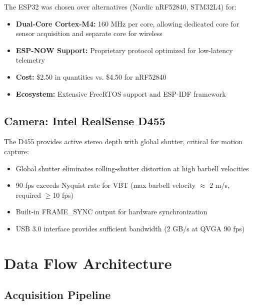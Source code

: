The ESP32 was chosen over alternatives (Nordic nRF52840, STM32L4) for:

\begin{itemize}
    \item \textbf{Dual-Core Cortex-M4:} 160 MHz per core, allowing dedicated core for sensor acquisition and separate core for wireless
    \item \textbf{ESP-NOW Support:} Proprietary protocol optimized for low-latency telemetry
    \item \textbf{Cost:} \$2.50 in quantities vs. \$4.50 for nRF52840
    \item \textbf{Ecosystem:} Extensive FreeRTOS support and ESP-IDF framework
\end{itemize}

\subsection{Camera: Intel RealSense D455}

The D455 provides active stereo depth with global shutter, critical for motion capture:

\begin{itemize}
    \item Global shutter eliminates rolling-shutter distortion at high barbell velocities
    \item 90 fps exceeds Nyquist rate for VBT (max barbell velocity $\approx$ 2 m/s, required $\ge$10 fps)
    \item Built-in FRAME\_SYNC output for hardware synchronization
    \item USB 3.0 interface provides sufficient bandwidth (2 GB/s at QVGA 90 fps)
\end{itemize}

\section{Data Flow Architecture}

\subsection{Acquisition Pipeline}

